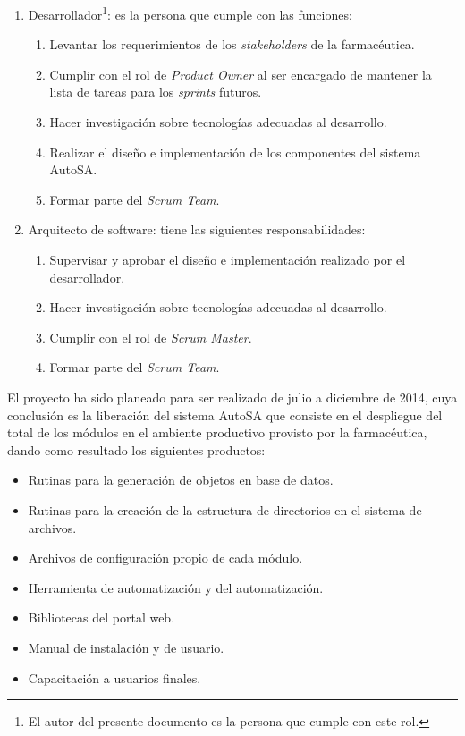 \begin{enumerate}
	\item Desarrollador\footnote{El autor del presente documento es la persona que cumple con este rol.}: es la persona que cumple con las funciones:
	\begin{enumerate}
		\item Levantar los requerimientos de los \textit{stakeholders} de la farmacéutica.
		\item Cumplir con el rol de \textit{Product Owner} al ser encargado de mantener la lista de tareas para los \textit{sprints} futuros.
		\item Hacer investigación sobre tecnologías adecuadas al desarrollo.
		\item Realizar el diseño e implementación de los componentes del sistema AutoSA.
		\item Formar parte del \textit{Scrum Team}.
	\end{enumerate}
	\item Arquitecto de software: tiene las siguientes responsabilidades:
	\begin{enumerate}
		\item Supervisar y aprobar el diseño e implementación realizado por el desarrollador.
		\item Hacer investigación sobre tecnologías adecuadas al desarrollo.
		\item Cumplir con el rol de \textit{Scrum Master}.
		\item Formar parte del \textit{Scrum Team}.
	\end{enumerate}
\end{enumerate}
El proyecto ha sido planeado para ser realizado de julio a diciembre de 2014, cuya conclusión es la liberación del sistema AutoSA que consiste en el despliegue del total de los módulos en el ambiente productivo provisto por la farmacéutica, dando como resultado los siguientes productos:
\begin{itemize}
\item Rutinas para la generación de objetos en base de datos.
\item Rutinas para la creación de la estructura de directorios en el sistema de archivos.
\item Archivos de configuración propio de cada módulo.
\item Herramienta de automatización y del automatización.
\item Bibliotecas del portal web.
\item Manual de instalación y de usuario.
\item Capacitación a usuarios finales.
\end{itemize}
 

